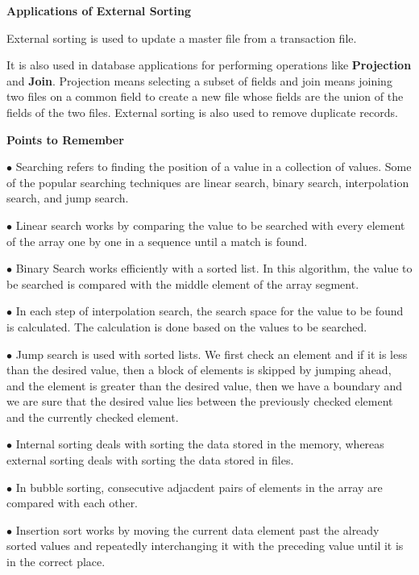 \vskip 3mm
{\bf Applications of External Sorting}

\vskip 1mm
External sorting is used to update a master file from a transaction file.

\vskip 1mm
It is also used in database applications for performing operations like {\bf Projection} and {\bf Join}. Projection means selecting a subset of fields and join means joining two files on a common field to create a new file whose fields are the union of the fields of the two files. External sorting is also used to remove duplicate records.

\filbreak
\vskip 1cm
{\bf Points to Remember}

\vskip 3mm
\qquad$\bullet$ Searching refers to finding the position of a value in a collection of values. Some of the popular searching techniques are linear search, binary search, interpolation search, and jump search.

\vskip 3mm
\qquad$\bullet$ Linear search works by comparing the value to be searched with every element of the array one by one in a sequence until a match is found.

\vskip 3mm
\qquad$\bullet$ Binary Search works efficiently with a sorted list. In this algorithm, the value to be searched is compared with the middle element of the array segment.

\vskip 3mm
\qquad$\bullet$ In each step of interpolation search, the search space for the value to be found is calculated. The calculation is done based on the values to be searched.

\vskip 3mm
\qquad$\bullet$ Jump search is used with sorted lists. We first check an element and if it is less than the desired value, then a block of elements is skipped by jumping ahead, and the element is greater than the desired value, then we have a boundary and we are sure that the desired value lies between the previously checked element and the currently checked element.

\vskip 3mm
\qquad$\bullet$ Internal sorting deals with sorting the data stored in the memory, whereas external sorting deals with sorting the data stored in files.

\vskip 3mm
\qquad$\bullet$ In bubble sorting, consecutive adjacdent pairs of elements in the array are compared with each other.

\vskip 3mm
\qquad$\bullet$ Insertion sort works by moving the current data element past the already sorted values and repeatedly interchanging it with the preceding value until it is in the correct place.

